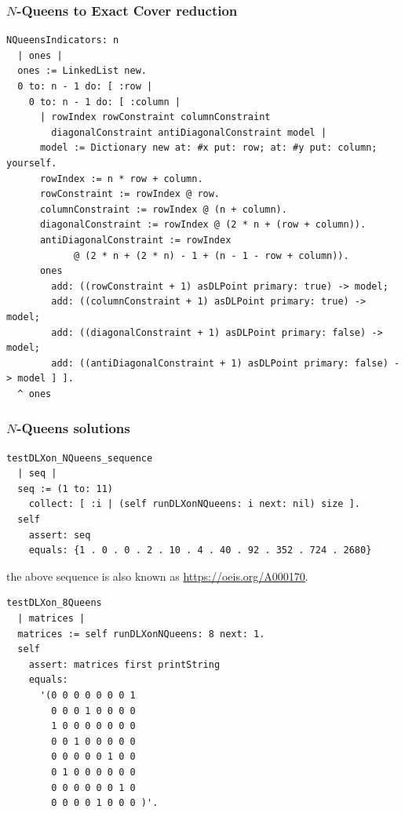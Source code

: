 \documentclass[10pt]{beamer}
\begin{document}
\begin{frame}[fragile]
\frametitle{$N$-Queens to Exact Cover reduction}
\begin{verbatim}
NQueensIndicators: n
  | ones |
  ones := LinkedList new.
  0 to: n - 1 do: [ :row | 
    0 to: n - 1 do: [ :column | 
      | rowIndex rowConstraint columnConstraint 
        diagonalConstraint antiDiagonalConstraint model |
      model := Dictionary new at: #x put: row; at: #y put: column; yourself.
      rowIndex := n * row + column.
      rowConstraint := rowIndex @ row.
      columnConstraint := rowIndex @ (n + column).
      diagonalConstraint := rowIndex @ (2 * n + (row + column)).
      antiDiagonalConstraint := rowIndex
            @ (2 * n + (2 * n) - 1 + (n - 1 - row + column)).
      ones
        add: ((rowConstraint + 1) asDLPoint primary: true) -> model;
        add: ((columnConstraint + 1) asDLPoint primary: true) -> model;
        add: ((diagonalConstraint + 1) asDLPoint primary: false) -> model;
        add: ((antiDiagonalConstraint + 1) asDLPoint primary: false) -> model ] ].
  ^ ones
\end{verbatim}
\end{frame}

\begin{frame}[fragile]
\frametitle{$N$-Queens solutions}
\begin{verbatim}
testDLXon_NQueens_sequence
  | seq |
  seq := (1 to: 11)
    collect: [ :i | (self runDLXonNQueens: i next: nil) size ].
  self
    assert: seq
    equals: {1 . 0 . 0 . 2 . 10 . 4 . 40 . 92 . 352 . 724 . 2680}
\end{verbatim}
the above sequence is also known as \url{https://oeis.org/A000170}.
\begin{verbatim}
testDLXon_8Queens
  | matrices |
  matrices := self runDLXonNQueens: 8 next: 1.
  self
    assert: matrices first printString
    equals:
      '(0 0 0 0 0 0 0 1
        0 0 0 1 0 0 0 0
        1 0 0 0 0 0 0 0
        0 0 1 0 0 0 0 0
        0 0 0 0 0 1 0 0
        0 1 0 0 0 0 0 0
        0 0 0 0 0 0 1 0
        0 0 0 0 1 0 0 0 )'.
\end{verbatim}

\end{frame}
\end{document}
